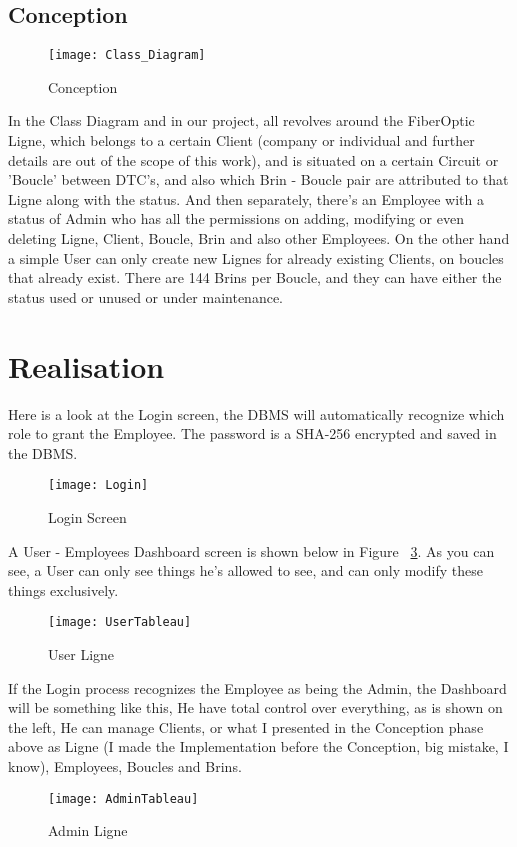 \subsection{Conception}
\begin{figure}[ht!] %
  \centering
  \texttt{[image: Class\_Diagram]}
  \caption[Class Diagram]{Conception}%
  \label{fig:DiagClass1}
\end{figure}
In the Class Diagram and in our project, all revolves around the FiberOptic Ligne, which belongs to a certain Client (company or individual and further details are out of the scope of this work), and is situated on a certain Circuit or 'Boucle' between DTC's, and also which Brin - Boucle pair are attributed to that Ligne along with the status. And then separately, there's an Employee with a status of Admin who has all the permissions on adding, modifying or even deleting Ligne, Client, Boucle, Brin and also other Employees. On the other hand a simple User can only create new Lignes for already existing Clients, on boucles that already exist.
There are 144 Brins per Boucle, and they can have either the status used or unused or under maintenance.
\section{Realisation}%

Here is a look at the Login screen, the DBMS will automatically recognize which role to grant the Employee. The password is a SHA-256 encrypted and saved in the DBMS.
\begin{figure}[ht!] %
  \centering
  \texttt{[image: Login]}
  \caption[Login]{Login Screen}%
  \label{fig:Login}
\end{figure}
A User - Employees Dashboard screen is shown below in Figure ~\ref{fig:UserTable}. As you can see, a User can only see things he's allowed to see, and can only modify these things exclusively.
\begin{figure}[ht!] %
  \centering
  \texttt{[image: UserTableau]}
  \caption[UserClientsTable]{ User Ligne}%
  \label{fig:UserTable}
\end{figure}
If the Login process recognizes the Employee as being the Admin, the Dashboard will be something like this, He have total control over everything, as is shown on the left, He can manage Clients, or what I presented in the Conception phase above as Ligne (I made the Implementation before the Conception, big mistake, I know), Employees, Boucles and Brins.
\begin{figure}[ht!] %
  \centering
  \texttt{[image: AdminTableau]}
  \caption[AdminClientsTable]{Admin Ligne}%
  \label{fig:AdminClientsTable}
\end{figure}

